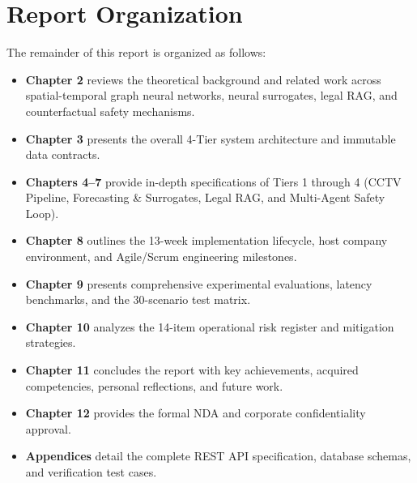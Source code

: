 \section{Report Organization}
The remainder of this report is organized as follows:
\begin{itemize}[leftmargin=1.5cm, label=--]
  \item \textbf{Chapter 2} reviews the theoretical background and related work across spatial-temporal graph neural networks, neural surrogates, legal RAG, and counterfactual safety mechanisms.
  \item \textbf{Chapter 3} presents the overall 4-Tier system architecture and immutable data contracts.
  \item \textbf{Chapters 4--7} provide in-depth specifications of Tiers 1 through 4 (CCTV Pipeline, Forecasting \& Surrogates, Legal RAG, and Multi-Agent Safety Loop).
  \item \textbf{Chapter 8} outlines the 13-week implementation lifecycle, host company environment, and Agile/Scrum engineering milestones.
  \item \textbf{Chapter 9} presents comprehensive experimental evaluations, latency benchmarks, and the 30-scenario test matrix.
  \item \textbf{Chapter 10} analyzes the 14-item operational risk register and mitigation strategies.
  \item \textbf{Chapter 11} concludes the report with key achievements, acquired competencies, personal reflections, and future work.
  \item \textbf{Chapter 12} provides the formal NDA and corporate confidentiality approval.
  \item \textbf{Appendices} detail the complete REST API specification, database schemas, and verification test cases.
\end{itemize}
